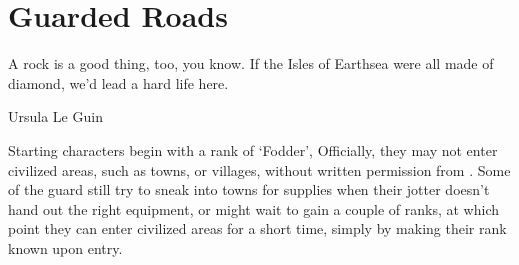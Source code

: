 \chapter{Guarded Roads}
\epigraph{A rock is a good thing, too, you know. If the Isles of Earthsea were all made of diamond, we'd lead a hard life here.}{Ursula Le Guin}

\noindent
Starting characters begin with a rank of `Fodder',%
Officially, they may not enter civilized areas, such as towns, or \glspl{village}, without written permission from .
Some of the \gls{guard} still try to sneak into towns for supplies when their \gls{jotter} doesn't hand out the right equipment, or might wait to gain a couple of ranks, at which point they can enter civilized areas for a short time, simply by making their rank known upon entry.

